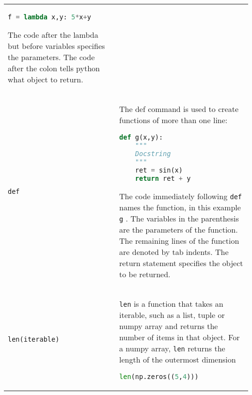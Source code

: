 \documentclass[]{article}
\begin{document}
\begin{longtable}[]{@{}ll@{}}
\begin{minipage}[t]{0.77\columnwidth}
\begin{lstlisting}[language=Python]
f = lambda x,y: 5*x+y
\end{lstlisting}

The code after the lambda but before variables specifies the parameters.
The code after the colon tells python what object to return.\strut
\end{minipage}\tabularnewline
\begin{minipage}[t]{0.17\columnwidth}\raggedright\strut
\lstinline!def!\strut
\end{minipage} & \begin{minipage}[t]{0.77\columnwidth}\raggedright\strut
The def command is used to create functions of more than one line:

\begin{lstlisting}[language=Python]
def g(x,y):
    """
    Docstring
    """
    ret = sin(x)
    return ret + y
\end{lstlisting}

The code immediately following \lstinline!def! names the function, in
this example \lstinline!g! . The variables in the parenthesis are the
parameters of the function. The remaining lines of the function are
denoted by tab indents. The return statement specifies the object to be
returned.\strut
\end{minipage}\tabularnewline
\begin{minipage}[t]{0.17\columnwidth}\raggedright\strut
\lstinline!len(iterable)!\strut
\end{minipage} & \begin{minipage}[t]{0.77\columnwidth}\raggedright\strut
\lstinline!len! is a function that takes an iterable, such as a list,
tuple or numpy array and returns the number of items in that object. For
a numpy array, \lstinline!len! returns the length of the outermost
dimension

\begin{lstlisting}[language=Python]
len(np.zeros((5,4)))
\end{lstlisting}


\end{minipage}
\end{longtable}
\end{document}
